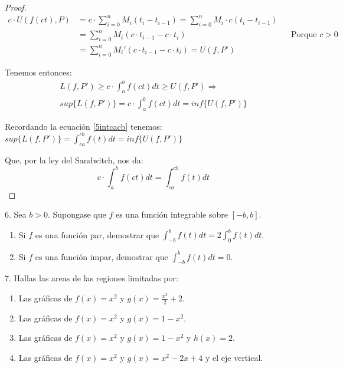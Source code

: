 \documentclass[12pt]{article}
\begin{document}
\begin{proof}
    \begin{align*}
        c\cdot U(f(ct),P) &= c \cdot \sum_{i=0}^n M_i(t_i-t_{i-1}) = \sum_{i=0}^n M_i\cdot c(t_i-t_{i-1}) \\
        &= \sum_{i=0}^n M_i(c\cdot t_{i-1}-c\cdot t_i) \quad &&\text{Porque $c>0$}\\
        &= \sum_{i=0}^n M_i'(c\cdot t_{i-1}-c\cdot t_i) = U(f,P')
    \end{align*}

    Tenemos entonces:
    \begin{multline*}
        L(f,P')\geq c\cdot\int_{a}^{b}f(ct)dt\geq U(f,P') \Longrightarrow \\ sup\{L(f,P')\}=c\cdot\int_{a}^{b}f(ct)dt=inf\{U(f,P')\}
    \end{multline*}

    Recordando la ecuaci\'on \eqref{5intcacb} tenemos: \(sup\{L(f,P')\}=\displaystyle\int_{ca}^{cb}f(t)dt=inf\{U(f,P')\}\)

    Que, por la ley del Sandwitch, nos da:
    \begin{equation*}
        c\cdot\int_{a}^{b}f(ct)dt=\int_{ca}^{cb}f(t)dt
    \end{equation*}
\end{proof}

6. Sea $b>0$. Supongase que $f$ es una funci\'on integrable sobre $[-b,b]$.

\begin{enumerate}[\hspace{9px} a)]
    \item Si $f$ es una funci\'on par, demostrar que \(\displaystyle\int_{-b}^{b}f(t)dt=2\int_{0}^{b}f(t)dt\).

    \item Si $f$ es una funci\'on impar, demostrar que \(\displaystyle\int_{-b}^{b}f(t)dt=0\).

\end{enumerate}

7. Hallas las areas de las regiones limitadas por:

\begin{enumerate}[\hspace{9px} a)]
    \item Las gr\'aficas de \(f(x)=x^2\) y \(g(x)=\displaystyle\frac{x^2}{2}+2\).

    \item Las gr\'aficas de \(f(x)=x^2\) y \(g(x)=1-x^2\).

    \item Las gr\'aficas de \(f(x)=x^2\) y \(g(x)=1-x^2\) y \(h(x)=2\).

    \item Las gr\'aficas de \(f(x)=x^2\) y \(g(x)=x^2-2x+4\) y el eje vertical.

\end{enumerate}
\end{document}

